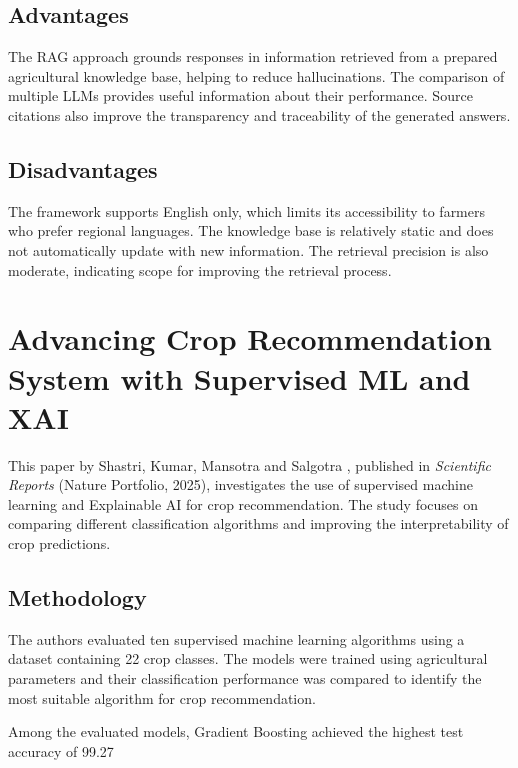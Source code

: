 \subsection{Advantages}

The RAG approach grounds responses in information retrieved from a prepared agricultural knowledge base, helping to reduce hallucinations. The comparison of multiple LLMs provides useful information about their performance. Source citations also improve the transparency and traceability of the generated answers.

\subsection{Disadvantages}

The framework supports English only, which limits its accessibility to farmers who prefer regional languages. The knowledge base is relatively static and does not automatically update with new information. The retrieval precision is also moderate, indicating scope for improving the retrieval process.

\section{Advancing Crop Recommendation System with Supervised ML and XAI}

This paper by Shastri, Kumar, Mansotra and Salgotra , published in \emph{Scientific Reports} (Nature Portfolio, 2025), investigates the use of supervised machine learning and Explainable AI for crop recommendation. The study focuses on comparing different classification algorithms and improving the interpretability of crop predictions.

\subsection{Methodology}

The authors evaluated ten supervised machine learning algorithms using a dataset containing 22 crop classes. The models were trained using agricultural parameters and their classification performance was compared to identify the most suitable algorithm for crop recommendation.

Among the evaluated models, Gradient Boosting achieved the highest test accuracy of 99.27%

